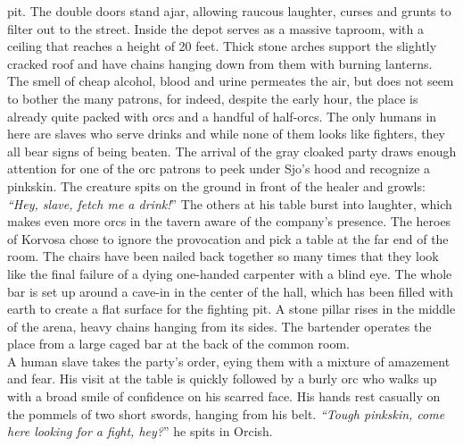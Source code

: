 pit. The double doors stand ajar, allowing raucous laughter, curses and grunts to filter out to the street. Inside the depot serves as a massive taproom, with a ceiling that reaches a height of 20 feet. Thick stone arches support the slightly cracked roof and have chains hanging down from them with burning lanterns. The smell of cheap alcohol, blood and urine permeates the air, but does not seem to bother the many patrons, for indeed, despite the early hour, the place is already quite packed with orcs and a handful of half-orcs. The only humans in here are slaves who serve drinks and while none of them looks like fighters, they all bear signs of being beaten. The arrival of the gray cloaked party draws enough attention for one of the orc patrons to peek under Sjo's hood and recognize a pinkskin. The creature spits on the ground in front of the healer and growls: {\itshape``Hey, slave, fetch me a drink!}'' The others at his table burst into laughter, which makes even more orcs in the tavern aware of the company's presence. The heroes of Korvosa chose to ignore the provocation and pick a table at the far end of the room. The chairs have been nailed back together so many times that they look like the final failure of a dying one-handed carpenter with a blind eye. The whole bar is set up around a cave-in in  the center of the hall, which has been filled with earth to create a flat surface for the fighting pit. A stone pillar rises in the middle of the arena, heavy chains hanging from its sides. The bartender operates the place from a large caged bar at the back of the common room.\\

A human slave takes the party's order, eying them with a mixture of amazement and fear. His visit at the table is quickly followed by a burly orc who walks up with a broad smile of confidence on his scarred face. His hands rest casually on the pommels of two short swords, hanging from his belt. {\itshape``Tough pinkskin, come here looking for a fight, hey?}'' he spits in Orcish.\\

